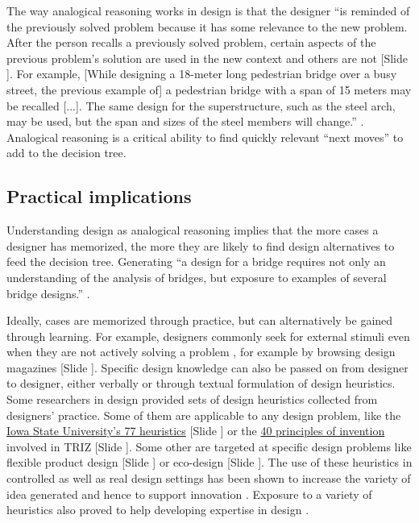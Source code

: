 \documentclass{article}
\newcounter{slide}
\begin{document}
The way analogical reasoning works in design is that the designer ``is reminded of the previously solved problem because it has some relevance to the new problem. After the person recalls a previously solved problem, certain aspects of the previous problem's solution are used in the new context and others are not {\color{blue}[Slide ]}. For example, [While designing a 18-meter long pedestrian bridge over a busy street, the previous example of] a pedestrian bridge with a span of 15 meters may be recalled [...]. The same design for the superstructure, such as the steel arch, may be used, but the span and sizes of the steel members will change.'' \cite[p. 1-4]{maher2014case}. Analogical reasoning is a critical ability to find quickly relevant ``next moves'' to add to the decision tree.

\subsection{Practical implications}
\label{sec:Practicalimplicationsone}
Understanding design as analogical reasoning implies that the more cases a designer has memorized, the more they are likely to find design alternatives to feed the decision tree. Generating ``a design for a bridge requires not only an understanding of the analysis of bridges, but exposure to examples of several bridge designs.'' \cite[p. 1]{maher2014case}.
 
Ideally, cases are memorized through practice, but can alternatively be gained through learning. For example, designers commonly seek for external stimuli even when they are not actively solving a problem \cite{goncalvesInspirationChoicesThat2016}, for example by browsing design magazines {\color{blue}[Slide ]}. Specific design knowledge can also be passed on from designer to designer, either verbally or through textual formulation of design heuristics. Some researchers in design provided sets of design heuristics collected from designers' practice. Some of them are applicable to any design problem, like the \href{https://www.design.iastate.edu/news/2016/08/design-heuristics/}{Iowa State University's 77 heuristics} {\color{blue}[Slide ]} or the \href{https://en.wikipedia.org/wiki/40_principles_of_invention}{40 principles of invention} involved in TRIZ {\color{blue}[Slide ]}. Some other are targeted at specific design problems like flexible product design {\color{blue}[Slide ]} or eco-design {\color{blue}[Slide ]}. The use of these heuristics in controlled as well as real design settings has been shown to increase the variety of idea generated and hence to support innovation \cite{yilmazCanExperiencedDesigners2013}. Exposure to a variety of heuristics also proved to help developing expertise in design \cite{yilmazHowDesignersGenerate2015}. 
\end{document}
